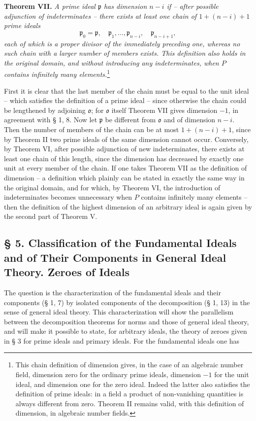 \documentclass[11pt]{article}
\providecommand{\frakp}{\mathfrak p}
\providecommand{\frako}{\mathfrak o}
\begin{document}
\textbf{Theorem VII.} \emph{A prime ideal $\frakp$ has dimension $n-i$ if -- after possible adjunction of indeterminates -- there exists at least one chain of $1+(n-i)+1$ prime ideals}
\[
 \frakp_0=\frakp,\quad \frakp_1,\ldots,\frakp_{n-i},\quad \frakp_{n-i+1},
\]
\emph{each of which is a proper divisor of the immediately preceding one, whereas no such chain with a larger number of members exists. This definition also holds in the original domain, and without introducing any indeterminates, when $P$ contains infinitely many elements.}\footnote{This chain definition of dimension gives, in the case of an algebraic number field, dimension zero for the ordinary prime ideals, dimension $-1$ for the unit ideal, and dimension one for the zero ideal. Indeed the latter also satisfies the definition of prime ideals: in a field a product of non-vanishing quantities is always different from zero. Theorem II remains valid, with this definition of dimension, in algebraic number fields.}

First it is clear that the last member of the chain must be equal to the unit ideal -- which satisfies the definition of a prime ideal -- since otherwise the chain could be lengthened by adjoining $\frako$; for $\frako$ itself Theorem VII gives dimension $-1$, in agreement with § 1, 8. Now let $\frakp$ be different from $\frako$ and of dimension $n-i$. Then the number of members of the chain can be at most $1+(n-i)+1$, since by Theorem II two prime ideals of the same dimension cannot occur. Conversely, by Theorem VI, after possible adjunction of new indeterminates, there exists at least one chain of this length, since the dimension has decreased by exactly one unit at every member of the chain. If one takes Theorem VII as the definition of dimension -- a definition which plainly can be stated in exactly the same way in the original domain, and for which, by Theorem VI, the introduction of indeterminates becomes unnecessary when $P$ contains infinitely many elements -- then the definition of the highest dimension of an arbitrary ideal is again given by the second part of Theorem V.

\subsection*{§ 5. Classification of the Fundamental Ideals and of Their Components in General Ideal Theory. Zeroes of Ideals}

The question is the characterization of the fundamental ideals and their components (§ 1, 7) by isolated components of the decomposition (§ 1, 13) in the sense of general ideal theory. This characterization will show the parallelism between the decomposition theorems for norms and those of general ideal theory, and will make it possible to state, for arbitrary ideals, the theory of zeroes given in § 3 for prime ideals and primary ideals. For the fundamental ideals one has
\end{document}

